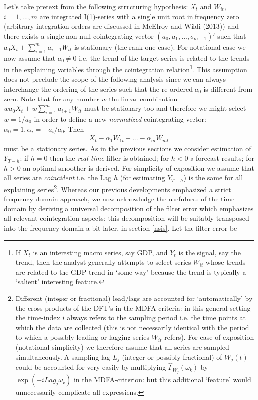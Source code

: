 \documentclass[11pt]{article}
\begin{document}
Let's take pretext from the following structuring hypothesis:  $X_t$ and $W_{it}$, $i=1,...,m$ are integrated I(1)-series with a single unit root in frequency zero (arbitrary integration orders are discussed in McElroy and Wildi (2013)) and there exists a single non-null cointegrating vector $(a_0,a_1,...,a_{m+1})'$ such that $a_0X_t+\sum_{i=1}^ma_{i+1}W_{it}$ is stationary (the rank one case). For notational ease we now assume that $a_0\not=0$ i.e. the trend of the target series is related to the trends in the explaining variables through the cointegration relation\footnote{If $X_t$ is an interesting macro series, say GDP, and $Y_t$ is the signal, say the trend, then the analyst generally attempts to select series $W_{it}$ whose trends are related to the GDP-trend in `some way' because the trend is typically a `salient' interesting feature.}. This assumption does not preclude the scope of the following analysis since we can always interchange the ordering of the series such that the re-ordered $a_0$ is different from zero. Note that for any number $w$ the linear combination $wa_0X_t+w\sum_{i=1}^ma_{i+1}W_{it}$ must  be stationary too  and therefore we might select $w=1/a_0$ in order to define a new \emph{normalized} cointegrating vector: $\alpha_0=1,\alpha_i=-a_i/a_0$. Then 
\begin{eqnarray}\label{coint}
X_t-\alpha_1W_{1t}-...-\alpha_mW_{mt}
\end{eqnarray}
must be a stationary series. As in the previous sections we consider estimation of $Y_{T-h}$: if $h=0$ then the \emph{real-time} filter is obtained; for $h<0$ a forecast results; for $h>0$ an optimal smoother is derived. For simplicity of exposition we assume that all series are \emph{coincident} i.e. the Lag $h$ (for estimating $Y_{T-h}$) is the same for all explaining series\footnote{Different (integer or fractional) lead/lags are accounted for `automatically' by the cross-products of the DFT's in the MDFA-criteria: in this general setting the time-index $t$ always refers to the sampling period i.e. the time points at which the data are collected (this is not necessarily identical with the period to which a possibly leading or lagging  series $W_{it}$ refers). For ease of exposition (notational simplicity) we therefore assume that all series are sampled simultaneously. A sampling-lag $L_j$ (integer or possibly fractional) of $W_j(t)$ could be accounted for very easily by multiplying $\hat{\Gamma}_{W_j}(\omega_k)$ by $\exp(-iLag_j\omega_k)$ in the MDFA-criterion: but this additional `feature' would unnecessarily complicate all expressions.}. Whereas our previous developments emphasized a strict frequency-domain approach, we now acknowledge the usefulness of the time-domain by deriving  a universal decomposition of the filter error which emphasizes all relevant cointegration aspects: this decomposition will be suitably transposed into the frequency-domain a bit later, in section \ref{nsis}. Let the filter error be
\end{document}
